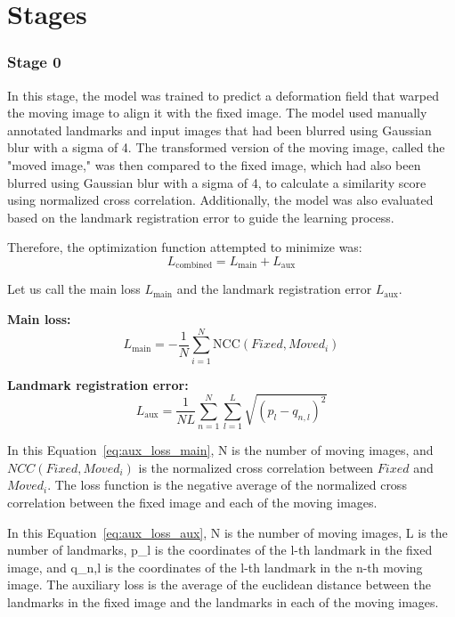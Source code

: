 \documentclass{report}
\begin{document}
	\section{Stages}
	\subsubsection{Stage 0}
	In this stage, the model was trained to predict a deformation field that warped the moving image to align it with the fixed image. The model used manually annotated landmarks and input images that had been blurred using Gaussian blur with a sigma of 4. The transformed version of the moving image, called the "moved image," was then compared to the fixed image, which had also been blurred using Gaussian blur with a sigma of 4, to calculate a similarity score using normalized cross correlation. Additionally, the model was also evaluated based on the landmark registration error to guide the learning process.
	
	Therefore, the optimization function attempted to minimize was:
	\begin{equation}\label{eq:aux_loss_combined}
		L_\text{combined} = L_\text{main} + L_\text{aux}
	\end{equation}
	
	Let us call the main loss $L_\text{main}$ and the landmark registration error $L_\text{aux}$.
	
	\textbf{Main loss:}
	\begin{equation}\label{eq:aux_loss_main}
		L_\text{main} = -\frac{1}{N} \sum_{i=1}^N \text{NCC}(Fixed, Moved_i)
	\end{equation}
		
	\textbf{Landmark registration error:}
	\begin{equation}\label{eq:aux_loss_aux}
		L_\text{aux} = \frac{1}{NL} \sum_{n=1}^N \sum_{l=1}^L \sqrt{(p_l - q_{n,l})^2}
	\end{equation}
	
	In this Equation~\ref{eq:aux_loss_main}, N is the number of moving images, and $NCC(Fixed, Moved_i)$ is the normalized cross correlation between $Fixed$ and $Moved_i$. The loss function is the negative average of the normalized cross correlation between the fixed image and each of the moving images.
	
	In this Equation~\ref{eq:aux_loss_aux}, N is the number of moving images, L is the number of landmarks, p\_l is the coordinates of the l-th landmark in the fixed image, and q\_{n,l} is the coordinates of the l-th landmark in the n-th moving image. The auxiliary loss is the average of the euclidean distance between the landmarks in the fixed image and the landmarks in each of the moving images.
	
\end{document}
